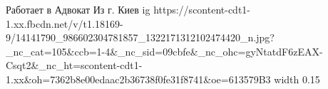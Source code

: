  
 
 
 
 

\par
Работает в Адвокат
Из г. Киев
\ifcmt
  ig https://scontent-cdt1-1.xx.fbcdn.net/v/t1.18169-9/14141790_986602304781857_1322171312102474420_n.jpg?_nc_cat=105&ccb=1-4&_nc_sid=09cbfe&_nc_ohc=gyNtatdF6zEAX-Csqt2&_nc_ht=scontent-cdt1-1.xx&oh=7362b8e00edaac2b36738f0fe31f8741&oe=613579B3
  width 0.15
\fi
